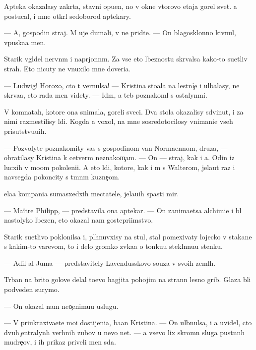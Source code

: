 \documentclass[10pt]{book}
\begin{document}
Apteka okazalasy zakr{\yi}ta, stavni opu{\x}en{\yi}, no v okne vtorovo etaja gorel svet. {\Y}a postucal, i mne otkr{\yi}l sedoborod{\yi}{\y} aptekary.

— A, gospodin straj. M{\yi} uje dumali, v{\yi} ne prid{\e}te. — On blagosklonno kivnul, vpuska{\y}a men{\ia}.

Starik v{\yi}gl{\ia}del nervn{\yi}m i napr{\ia}jonn{\yi}m. Za vse{\y} eto{\y} l{\io}beznost{\y}u skr{\yi}valsa kako{\y}-to su{\y}etliv{\yi}{\y} strah. Eto nicuty ne vnuxilo mne doveri{\y}a.

— Ludwig! Horoxo, cto t{\yi} vernulsa! — Kristina sto{\y}ala na lestni{\c}e i ul{\yi}balasy, ne skr{\yi}va{\y}a, cto rada men{\ia} videty. — Id{\e}m, {\y}a teb{\ia} poznakoml{\io} s ostalyn{\yi}mi.

V komnatah, ko\-to\-r{\yi}\-{\y}e ona snimala, goreli sveci. Dva stola okazalisy sdvinut{\yi}, i za nimi razmestilisy l{\io}di. Kogda {\y}a  voxol, na mne sosredotocilosy vnimani{\y}e vseh prisutstvu{\y}u{\x}ih.

— Pozvolyte poznakomity vas s gospodinom van Normaennom, druz{\y}a, — obratilasy Kristina k cetver{\yi}m neznakom{\c}am. — On — straj, kak i {\y}a. Odin iz lucxih v mo{\y}om pokoleni{\y}i. A eto l{\io}di, ko\-to\-r{\yi}\-{\y}e, kak i m{\yi} s Walterom, jela{\y}ut raz i navsegda pokoncity s t{\e}mn{\yi}m kuzne{\c}om.

{\C}ela{\y}a kompani{\y}a sumasxedxih mectatele{\y}, jela{\y}u{\x}ih spasti mir.

— Maître Philipp, — predstavila ona aptekar{\ia}. — On zanima{\y}etsa alchimi{\y}e{\y} i b{\yi}l nastolyko l{\io}bezen, cto okazal nam gostepri{\y}imstvo.

Starik su{\y}etlivo poklonilsa i, pl{\io}hnuvxisy na stul, stal pomexivaty lojecko{\y} v stakane s kakim-to varevom, to i delo gromko zv{\ia}ka{\y}a o tonku{\y}u stekl{\ia}nnu{\y}u stenku.

— Adil al Juma — predstavitely Lavendusskovo so{\y}uza v svo{\y}ih zeml{\ia}h.

T{\io}rban na brito{\y} golove delal to{\x}evo hagjita pohojim na strann{\yi}{\y} lesno{\y} grib. Glaza b{\yi}li podveden{\yi} surymo{\y}.

— On okazal nam neo{\c}enimu{\y}u uslugu.

— V{\yi} priukraxiva{\y}ete mo{\y}i dostijeni{\y}a, ba{\y}an Kristina. — On ul{\yi}bnulsa, i {\y}a uvidel, cto dvuh {\c}entralyn{\yi}h verhnih zubov u nevo net. — {\Y}a vsevo lix skromn{\yi}{\y} sluga pust{\yi}nn{\yi}h mudre{\c}ov, i ih prikaz{\yi} priveli men{\ia} s{\io}da.
\end{document}
